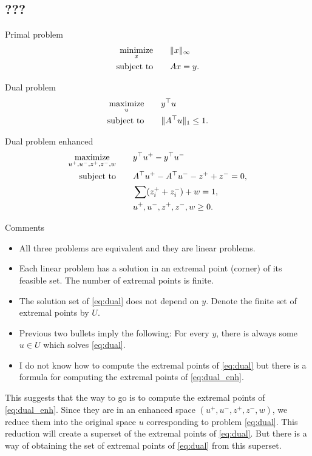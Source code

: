\documentclass[journal]{IEEEtranTIE}
\theoremstyle{definition}
\newcommand{\mnmz}{\operatorname*{minimize}}
\newcommand{\mxmz}{\operatorname*{maximize}}
\newcommand{\stt}{\operatorname{subject\ to}}
\newcommand{\norm}[1]{\|#1\|}
\begin{document}
\subsection{???}

Primal problem
\begin{equation}\label{eq:primal}
  \aligned
  \mnmz_x\qquad &\norm{x}_\infty \\
  \stt\qquad &Ax=y.
  \endaligned
\end{equation}

Dual problem
\begin{equation}\label{eq:dual}
  \aligned
  \mxmz_u\qquad &y^\top u \\
  \stt\qquad &\norm{A^\top u}_1 \le 1.
  \endaligned
\end{equation}

Dual problem enhanced
\begin{equation}\label{eq:dual_enh}
  \aligned
  \mxmz_{u^+,u^-,z^+,z^-,w}\qquad &y^\top u^+ - y^\top u^-  \\
  \stt\qquad &A^\top u^+ - A^\top u^- - z^+ + z^- = 0, \\
  &\sum(z_i^+ + z_i^-) + w = 1, \\
  &u^+,u^-,z^+,z^-,w \ge0.
  \endaligned
\end{equation}

Comments
\begin{itemize}\itemsep 0pt
 \item All three problems are equivalent and they are linear problems.
 \item Each linear problem has a solution in an extremal point (corner) of its feasible set. The number of extremal points is finite.
 \item The solution set of \eqref{eq:dual} does not depend on $y$. Denote the finite set of extremal points by $U$.
 \item Previous two bullets imply the following: For every $y$, there is always some $u\in U$ which solves \eqref{eq:dual}.
 \item I do not know how to compute the extremal points of \eqref{eq:dual} but there is a formula for computing the extremal points of \eqref{eq:dual_enh}.
\end{itemize}

This suggests that the way to go is to compute the extremal points of \eqref{eq:dual_enh}. Since they are in an enhanced space $(u^+,u^-,z^+,z^-,w)$, we reduce them into the original space $u$ corresponding to problem \eqref{eq:dual}. This reduction will create a superset of the extremal points of \eqref{eq:dual}. But there is a way of obtaining the set of extremal points of \eqref{eq:dual} from this superset.
\end{document}
